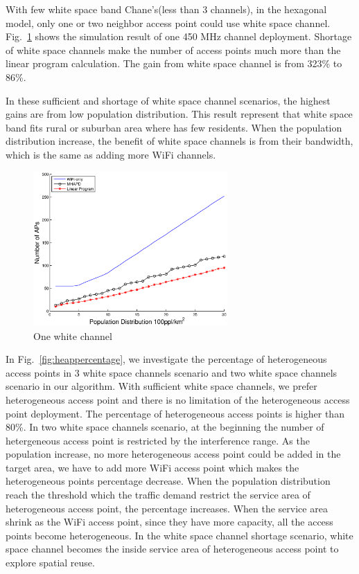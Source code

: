 With few white space band Chane's(less than 3 channels), in the hexagonal model, only one or 
two neighbor access point could use white space channel. Fig.~\ref{fig:onewhitechannel}
shows the simulation result of one 450 MHz channel deployment. Shortage of white space channels
make the number of access points much more than the linear program calculation. The gain from 
white space channel is from 323\% to 86\%. 

In these sufficient and shortage of white space channel scenarios, the highest gains are from 
low population distribution. This result represent that white space band fits rural or suburban
area where has few residents. When the population distribution increase, the benefit of white space
channels is from their bandwidth, which is the same as adding more WiFi channels.



\begin{figure}
\centering
\includegraphics[width=74mm]{figures/onewhitechannel}
\vspace{-0.1in}
\caption{One white channel}                                                                 
\label{fig:onewhitechannel}
\vspace{-0.1in}
\end{figure}

In Fig.~\ref{fig:heappercentage}, we investigate the percentage of heterogeneous access points
in 3 white space channels scenario and two white space channels scenario in our algorithm. 
With sufficient white space channels, we prefer heterogeneous access point and there is no 
limitation of the heterogeneous access point deployment. The percentage of heterogeneous access points
is higher than 80\%. In two white space channels scenario, at the beginning the number of hetergeneous
access point is restricted by the interference range. As the population increase, no more heterogeneous
access point could be added in the target area, we have to add more WiFi access point which makes the 
heterogeneous points percentage decrease. When the population distribution reach the threshold which
the traffic demand restrict the service area of heterogeneous access point, the percentage increases.
When the service area shrink as the WiFi access point, since they have more capacity, all the access
points become heterogeneous. In the white space channel shortage scenario, white space channel becomes
the inside service area of heterogeneous access point to explore spatial reuse.



